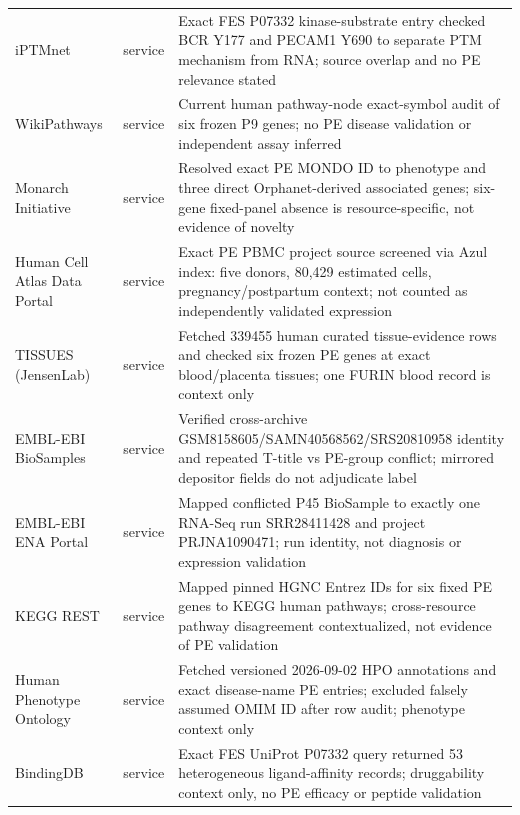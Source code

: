 \begin{longtable}{p{3.4cm}p{1.1cm}p{8.6cm}}
iPTMnet & service & Exact FES P07332 kinase-substrate entry checked BCR Y177 and PECAM1 Y690 to separate PTM mechanism from RNA; source overlap and no PE relevance stated\\
WikiPathways & service & Current human pathway-node exact-symbol audit of six frozen P9 genes; no PE disease validation or independent assay inferred\\
Monarch Initiative & service & Resolved exact PE MONDO ID to phenotype and three direct Orphanet-derived associated genes; six-gene fixed-panel absence is resource-specific, not evidence of novelty\\
Human Cell Atlas Data Portal & service & Exact PE PBMC project source screened via Azul index: five donors, 80,429 estimated cells, pregnancy/postpartum context; not counted as independently validated expression\\
TISSUES (JensenLab) & service & Fetched 339455 human curated tissue-evidence rows and checked six frozen PE genes at exact blood/placenta tissues; one FURIN blood record is context only\\
EMBL-EBI BioSamples & service & Verified cross-archive GSM8158605/SAMN40568562/SRS20810958 identity and repeated T-title vs PE-group conflict; mirrored depositor fields do not adjudicate label\\
EMBL-EBI ENA Portal & service & Mapped conflicted P45 BioSample to exactly one RNA-Seq run SRR28411428 and project PRJNA1090471; run identity, not diagnosis or expression validation\\
KEGG REST & service & Mapped pinned HGNC Entrez IDs for six fixed PE genes to KEGG human pathways; cross-resource pathway disagreement contextualized, not evidence of PE validation\\
Human Phenotype Ontology & service & Fetched versioned 2026-09-02 HPO annotations and exact disease-name PE entries; excluded falsely assumed OMIM ID after row audit; phenotype context only\\
BindingDB & service & Exact FES UniProt P07332 query returned 53 heterogeneous ligand-affinity records; druggability context only, no PE efficacy or peptide validation\\
\hline\end{longtable}
